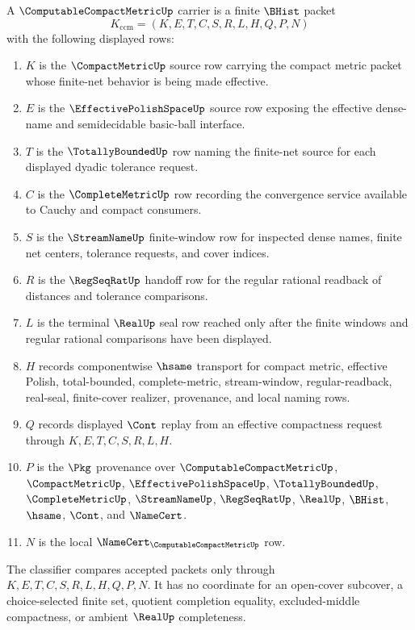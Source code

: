 \begin{definition}
\label{def:computable-compact-metric-carrier}
A $\ComputableCompactMetricUp$ carrier is a finite $\BHist$ packet
$$
K_{\mathrm{ccm}}=(K,E,T,C,S,R,L,H,Q,P,N)
$$
with the following displayed rows:
\begin{enumerate}
\item $K$ is the $\CompactMetricUp$ source row carrying the compact metric packet whose finite-net behavior is being made effective.
\item $E$ is the $\EffectivePolishSpaceUp$ source row exposing the effective dense-name and semidecidable basic-ball interface.
\item $T$ is the $\TotallyBoundedUp$ row naming the finite-net source for each displayed dyadic tolerance request.
\item $C$ is the $\CompleteMetricUp$ row recording the convergence service available to Cauchy and compact consumers.
\item $S$ is the $\StreamNameUp$ finite-window row for inspected dense names, finite net centers, tolerance requests, and cover indices.
\item $R$ is the $\RegSeqRatUp$ handoff row for the regular rational readback of distances and tolerance comparisons.
\item $L$ is the terminal $\RealUp$ seal row reached only after the finite windows and regular rational comparisons have been displayed.
\item $H$ records componentwise $\hsame$ transport for compact metric, effective Polish, total-bounded, complete-metric, stream-window, regular-readback, real-seal, finite-cover realizer, provenance, and local naming rows.
\item $Q$ records displayed $\Cont$ replay from an effective compactness request through $K,E,T,C,S,R,L,H$.
\item $P$ is the $\Pkg$ provenance over $\ComputableCompactMetricUp$, $\CompactMetricUp$, $\EffectivePolishSpaceUp$, $\TotallyBoundedUp$, $\CompleteMetricUp$, $\StreamNameUp$, $\RegSeqRatUp$, $\RealUp$, $\BHist$, $\hsame$, $\Cont$, and $\NameCert$.
\item $N$ is the local $\NameCert_{\ComputableCompactMetricUp}$ row.
\end{enumerate}
The classifier compares accepted packets only through $K,E,T,C,S,R,L,H,Q,P,N$. It has no coordinate for an open-cover subcover, a choice-selected finite set, quotient completion equality, excluded-middle compactness, or ambient $\RealUp$ completeness.
\end{definition}

